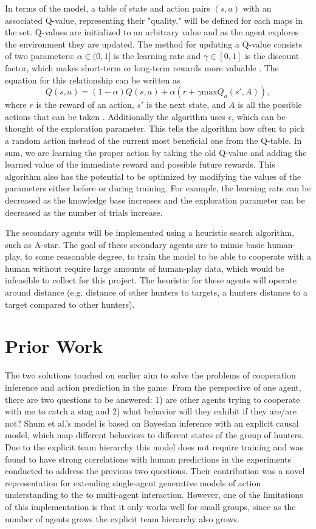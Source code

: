 \documentclass[10pt,twocolumn]{article}
\begin{document}
In terms of the model, a table of state and action pairs $(s, a)$ with an associated Q-value, representing their "quality," will be defined for each maps in the set.
Q-values are initialized to an arbitrary value and as the agent explores the environment they are updated.
The method for updating a Q-value consists of two parameters: $\alpha \in (0, 1]$ is the learning rate and $\gamma \in [0, 1]$ is the discount factor, which makes short-term or long-term rewards more valuable \cite{Kaelbling1996}.
The equation for this relationship can be written as \[ Q(s, a) = (1 - \alpha)Q(s, a) + \alpha(r + \gamma \text{max}Q_a(s', A)),\] where $r$ is the reward of an action, $s'$ is the next state, and $A$ is all the possible actions that can be taken \cite{}.
Additionally the algorithm uses $\epsilon$, which can be thought of the exploration parameter.
This tells the algorithm how often to pick a random action instead of the current most beneficial one from the Q-table.
In sum, we are learning the proper action by taking the old Q-value and adding the learned value of the immediate reward and possible future rewards.
This algorithm also has the potential to be optimized by modifying the values of the parameters either before or during training.
For example, the learning rate can be decreased as the knowledge base increases and the exploration parameter can be decreased as the number of trials increase.

The secondary agents will be implemented using a heuristic search algorithm, such as A-star.
The goal of these secondary agents are to mimic basic human-play, to some reasonable degree, to train the model to be able to cooperate with a human without require large amounts of human-play data, which would be infeasible to collect for this project.
The heuristic for these agents will operate around distance (e.g. distance of other hunters to targets, a hunters distance to a target compared to other hunters).

\section{Prior Work}

The two solutions touched on earlier aim to solve the problems of cooperation inference and action prediction in the game.
From the perspective of one agent, there are two questions to be answered: 1) are other agents trying to cooperate with me to catch a stag and 2) what behavior will they exhibit if they are/are not?
Shum et al.'s model is based on Bayesian inference with an explicit causal model, which map different behaviors to different states of the group of hunters.
Due to the explicit team hierarchy this model does not require training and was found to have strong correlations with human predictions in the experiments conducted to address the previous two questions.
Their contribution was a novel representation for extending single-agent generative models of action understanding to the to multi-agent interaction.
However, one of the limitations of this implementation is that it only works well for small groups, since as the number of agents grows the explicit team hierarchy also grows.
\end{document}
